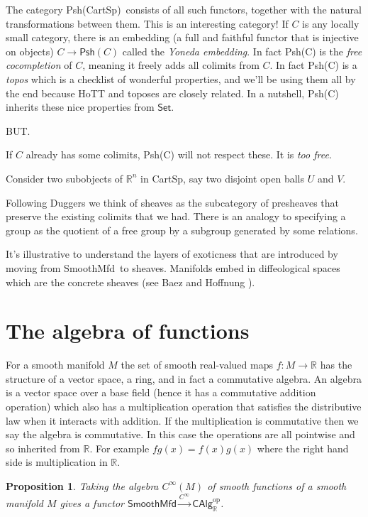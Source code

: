 \documentclass[12pt]{article}
\newcommand{\rr}{\ensuremath{\mathbb{R}}}
\newcommand{\cinfty}{\ensuremath{C^{\infty}}}
\newcommand{\smfd}{\textsf{SmoothMfd}}
\newcommand{\calg}{\textsf{CAlg}_{\rr}}
\newcommand{\cart}{\textsf{CartSp}}
\newcommand{\psh}[1]{\textsf{Psh}(#1)}
\newcommand{\pshcart}{\psh{\cart}}
\newtheorem{myprop}{Proposition}
\begin{document}
The category \pshcart\ consists of all such functors, together with the natural transformations between them. This is an interesting category! If $C$ is any locally small category, there is an embedding (a full and faithful functor that is injective on objects) $C\to\psh{C}$ called the \emph{Yoneda embedding}. In fact \psh{C} is the \emph{free cocompletion} of $C$, meaning it freely adds all colimits from $C$. In fact \psh{C} is a \emph{topos} which is a checklist of wonderful properties, and we'll be using them all by the end because HoTT and toposes are closely related. In a nutshell, \psh{C} inherits these nice properties from $\mathsf{Set}$.

BUT.

If $C$ already has some colimits, \psh{C} will not respect these. It is \emph{too free}. 

Consider two subobjects of $\rr^n$ in \cart, say two disjoint open balls $U$ and $V$. 

Following Duggers we think of sheaves as the subcategory of presheaves that preserve the existing colimits that we had. There is an analogy to specifying a group as the quotient of a free group by a subgroup generated by some relations.

It's illustrative to understand the layers of exoticness that are introduced by moving from \smfd\ to sheaves. Manifolds embed in diffeological spaces which are the concrete sheaves (see Baez and Hoffnung \cite{baez_convenient_2008}).

\section{The algebra of functions}\label{sec:algebras}

For a smooth manifold $M$ the set of smooth real-valued maps $f:M\to\rr$ has the structure of a vector space, a ring, and in fact a commutative algebra. An algebra is a vector space over a base field (hence it has a commutative addition operation) which also has a multiplication operation that satisfies the distributive law when it interacts with addition. If the multiplication is commutative then we say the algebra is commutative. In this case the operations are all pointwise and so inherited from \rr. For example $fg(x)=f(x)g(x)$ where the right hand side is multiplication in \rr.

\begin{myprop}\label{prop:algebrafunctor} Taking the algebra $\cinfty(M)$ of smooth functions of a smooth manifold $M$ gives a functor $\smfd\xrightarrow[]{\cinfty}\calg^{\mathrm{op}}$.
\end{myprop}
\end{document}
